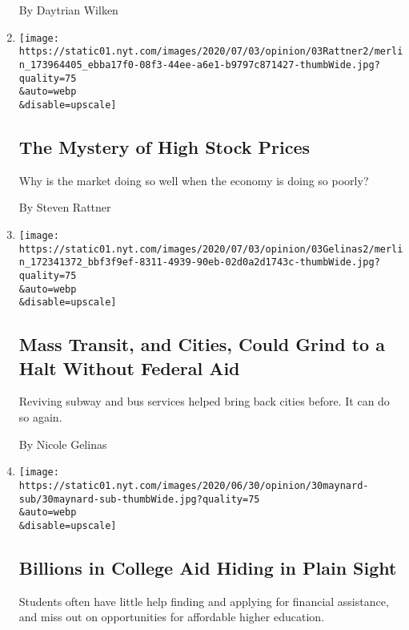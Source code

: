 \begin{enumerate}
  By Daytrian Wilken
\item
  \href{/2020/07/03/opinion/stock-market.html}{}

  \texttt{[image: https://static01.nyt.com/images/2020/07/03/opinion/03Rattner2/merlin\_173964405\_ebba17f0-08f3-44ee-a6e1-b9797c871427-thumbWide.jpg?quality=75\\\&auto=webp\\\&disable=upscale]}

  \hypertarget{the-mystery-of-high-stock-prices}{%
  \subsection{The Mystery of High Stock
  Prices}\label{the-mystery-of-high-stock-prices}}

  Why is the market doing so well when the economy is doing so poorly?

  By Steven Rattner
\item
  \href{/2020/07/03/opinion/coronavirus-mass-transit.html}{}

  \texttt{[image: https://static01.nyt.com/images/2020/07/03/opinion/03Gelinas2/merlin\_172341372\_bbf3f9ef-8311-4939-90eb-02d0a2d1743c-thumbWide.jpg?quality=75\\\&auto=webp\\\&disable=upscale]}

  \hypertarget{mass-transit-and-cities-could-grind-to-a-halt-without-federal-aid}{%
  \subsection{Mass Transit, and Cities, Could Grind to a Halt Without
  Federal
  Aid}\label{mass-transit-and-cities-could-grind-to-a-halt-without-federal-aid}}

  Reviving subway and bus services helped bring back cities before. It
  can do so again.

  By Nicole Gelinas
\item
  \href{/2020/06/30/opinion/college-financial-aid.html}{}

  \texttt{[image: https://static01.nyt.com/images/2020/06/30/opinion/30maynard-sub/30maynard-sub-thumbWide.jpg?quality=75\\\&auto=webp\\\&disable=upscale]}

  \hypertarget{billions-in-college-aid-hiding-in-plain-sight}{%
  \subsection{Billions in College Aid Hiding in Plain
  Sight}\label{billions-in-college-aid-hiding-in-plain-sight}}

  Students often have little help finding and applying for financial
  assistance, and miss out on opportunities for affordable higher
  education.


\end{enumerate}
